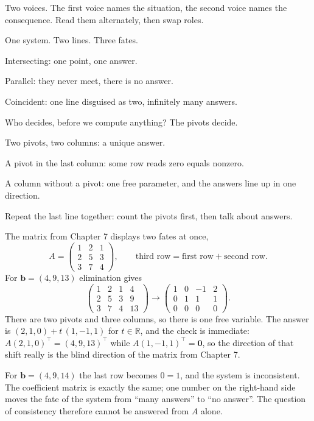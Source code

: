 \begin{bacakeras}
Two voices. The first voice names the situation, the second voice names the consequence. Read
them alternately, then swap roles.

One system. Two lines. Three fates.

Intersecting: one point, one answer.

Parallel: they never meet, there is no answer.

Coincident: one line disguised as two, infinitely many answers.

Who decides, before we compute anything? The pivots decide.

Two pivots, two columns: a unique answer.

A pivot in the last column: some row reads zero equals nonzero.

A column without a pivot: one free parameter, and the answers line up in one direction.

Repeat the last line together: count the pivots first, then talk about answers.
\end{bacakeras}

The matrix from Chapter 7 displays two fates at once,
\[
  A=\begin{pmatrix}1&2&1\\ 2&5&3\\ 3&7&4\end{pmatrix},
  \qquad \text{third row}=\text{first row}+\text{second row}.
\]
For $\mathbf{b}=(4,9,13)$ elimination gives
\[
  \left(\begin{array}{ccc|c}1&2&1&4\\ 2&5&3&9\\ 3&7&4&13\end{array}\right)
  \longrightarrow
  \left(\begin{array}{ccc|c}1&0&-1&2\\ 0&1&1&1\\ 0&0&0&0\end{array}\right).
\]
There are two pivots and three columns, so there is one free variable. The answer is
$(2,1,0)+t\,(1,-1,1)$ for $t\in\mathbb{R}$, and the check is immediate:
$A(2,1,0)^{\top}=(4,9,13)^{\top}$ while $A(1,-1,1)^{\top}=\mathbf{0}$, so the direction of that
shift really is the blind direction of the matrix from Chapter 7.

For $\mathbf{b}=(4,9,14)$ the last row becomes $0=1$, and the system is inconsistent. The
coefficient matrix is exactly the same; one number on the right-hand side moves the fate of the
system from ``many answers'' to ``no answer''. The question of consistency therefore cannot be
answered from $A$ alone.

